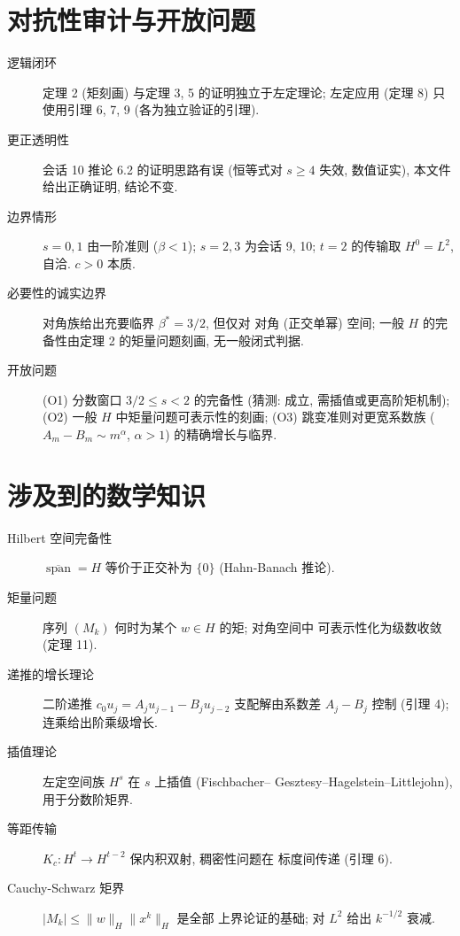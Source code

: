 \documentclass[UTF8]{ctexart}
\begin{document}
\section{对抗性审计与开放问题}

\begin{description}
	\item[逻辑闭环] 定理 2 (矩刻画) 与定理 3, 5 的证明独立于左定理论;
		左定应用 (定理 8) 只使用引理 6, 7, 9 (各为独立验证的引理).
	\item[更正透明性] 会话 10 推论 6.2 的证明思路有误 (恒等式对 $s \geq 4$
		失效, 数值证实), 本文件给出正确证明, 结论不变.
	\item[边界情形] $s = 0, 1$ 由一阶准则 ($\beta < 1$); $s = 2, 3$
		为会话 9, 10; $t = 2$ 的传输取 $H^0 = L^2$, 自洽. $c > 0$ 本质.
	\item[必要性的诚实边界] 对角族给出充要临界 $\beta^* = 3/2$, 但仅对
		对角 (正交单幂) 空间; 一般 $H$ 的完备性由定理 2 的矩量问题刻画,
		无一般闭式判据.
	\item[开放问题] (O1) 分数窗口 $3/2 \leq s < 2$ 的完备性 (猜测: 成立,
		需插值或更高阶矩机制); (O2) 一般 $H$ 中矩量问题可表示性的刻画;
		(O3) 跳变准则对更宽系数族 ($A_m - B_m \sim m^\alpha$, $\alpha > 1$)
		的精确增长与临界.
\end{description}

\section{涉及到的数学知识}

\begin{description}
	\item[Hilbert 空间完备性] $\overline{\operatorname{span}} = H$
		等价于正交补为 $\{0\}$ (Hahn-Banach 推论).
	\item[矩量问题] 序列 $(M_k)$ 何时为某个 $w \in H$ 的矩; 对角空间中
		可表示性化为级数收敛 (定理 11).
	\item[递推的增长理论] 二阶递推 $c_0 u_j = A_ju_{j-1} - B_ju_{j-2}$
		支配解由系数差 $A_j - B_j$ 控制 (引理 4); 连乘给出阶乘级增长.
	\item[插值理论] 左定空间族 $H^s$ 在 $s$ 上插值 (Fischbacher--
		Gesztesy--Hagelstein--Littlejohn), 用于分数阶矩界.
	\item[等距传输] $K_c: H^t \to H^{t-2}$ 保内积双射, 稠密性问题在
		标度间传递 (引理 6).
	\item[Cauchy-Schwarz 矩界] $|M_k| \leq \|w\|_H \|x^k\|_H$ 是全部
		上界论证的基础; 对 $L^2$ 给出 $k^{-1/2}$ 衰减.
\end{description}
\end{document}
